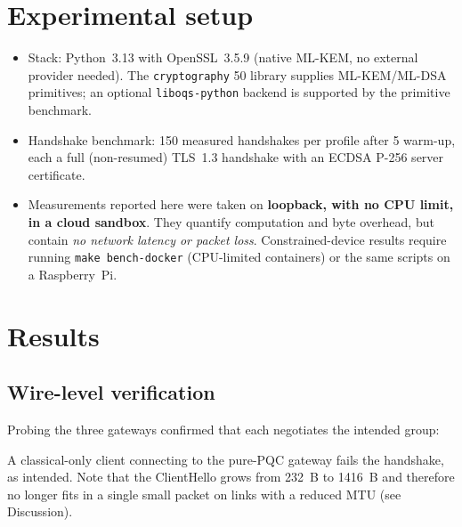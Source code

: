 \documentclass[11pt,a4paper]{article}
\newcommand{\mlkem}{ML-KEM-768}
\begin{document}
\section{Experimental setup}
\begin{itemize}
\item Stack: Python~3.13 with OpenSSL~3.5.9 (native ML-KEM, no external provider needed).
      The \texttt{cryptography} 50 library supplies ML-KEM/ML-DSA primitives; an optional
      \texttt{liboqs-python} backend is supported by the primitive benchmark.
\item Handshake benchmark: 150 measured handshakes per profile after 5 warm-up, each a full
      (non-resumed) TLS~1.3 handshake with an ECDSA P-256 server certificate.
\item Measurements reported here were taken on \textbf{loopback, with no CPU limit, in a cloud
      sandbox}. They quantify computation and byte overhead, but contain \emph{no network
      latency or packet loss}. Constrained-device results require running
      \texttt{make bench-docker} (CPU-limited containers) or the same scripts on a Raspberry~Pi.
\end{itemize}

\section{Results}
\subsection{Wire-level verification}
Probing the three gateways confirmed that each negotiates the intended group:

\begin{table}[H]\centering\footnotesize
{}
\caption{Observed negotiation. $1216 = 32 + 1184$ (X25519 + \mlkem{} encapsulation key).
The server's hybrid share is 1120~B ($32 + 1088$-byte ciphertext).}
\end{table}
A classical-only client connecting to the pure-PQC gateway fails the handshake, as intended.
Note that the ClientHello grows from 232~B to 1416~B and therefore no longer fits in a
single small packet on links with a reduced MTU (see Discussion).
\end{document}
